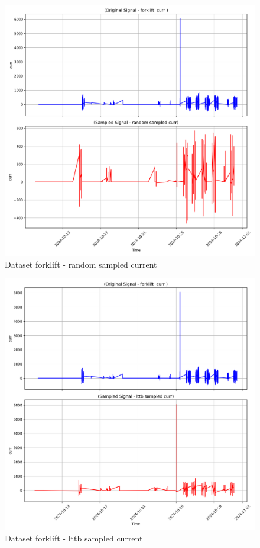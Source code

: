 \begin{figure}
    \centering
    \includegraphics[width=1\linewidth]{screenshots/forklift/random_sampled_curr_screenshot.png}
    \caption{Dataset forklift - random sampled current }
    \label{fig:forklift_random_sampled_curr_screenshot}
\end{figure}
\begin{figure}
    \centering
    \includegraphics[width=1\linewidth]{screenshots/forklift/lttb_sampled_curr_screenshot.png}
    \caption{Dataset forklift - lttb sampled current }
    \label{fig:forklift_lttb_sampled_curr_screenshot}
\end{figure}
